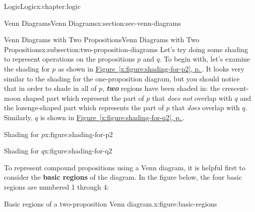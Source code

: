 \documentclass[twoside,10pt,]{book}
\newcommand{\xreffont}{\relax}
\newcommand{\alert}[1]{\textbf{\textit{#1}}}
\newcommand{\terminology}[1]{\textbf{#1}}
\numberwithin{equation}{section}
\begin{document}
\begin{chapterptx}{Logic}{}{Logic}{}{}{x:chapter:logic}
\begin{sectionptx}{Venn Diagrams}{}{Venn Diagrams}{}{}{x:section:sec-venn-diagrams}
\begin{subsectionptx}{Venn Diagrams with Two Propositions}{}{Venn Diagrams with Two Propositions}{}{}{x:subsection:two-proposition-diagrams}
Let's try doing some shading to represent operations on the propositions \(p\) and \(q\).  To begin with, let's examine the shading for \(p\) as shown in \hyperref[x:figure:shading-for-p2]{Figure~{\xreffont\ref{x:figure:shading-for-p2}}, p.\,\pageref{x:figure:shading-for-p2}}.  It looks very similar to the shading for the one-proposition diagram, but you should notice that in order to shade in all of \(p\), \alert{two} regions have been shaded in: the crescent-moon shaped part which represent the part of \(p\) that \emph{does not} overlap with \(q\) and the lozenge-shaped part which represents the part of \(p\) that \emph{does} overlap with \(q\).  Similarly, \(q\) is shown in \hyperref[x:figure:shading-for-q2]{Figure~{\xreffont\ref{x:figure:shading-for-q2}}, p.\,\pageref{x:figure:shading-for-q2}}.%
\par
\begin{sidebyside}{2}{0.05}{0.05}{0.1}%
\begin{sbspanel}{0.4}%
\begin{figureptx}{Shading for \(p\)}{x:figure:shading-for-p2}{}%
\resizebox{\linewidth}{!}{%
\begin{venndiagram2sets}[labelA={$p$},labelB={$q$}]
  \fillA
\end{venndiagram2sets}
}%
\tcblower
\end{figureptx}%
\end{sbspanel}%
\begin{sbspanel}{0.4}%
\begin{figureptx}{Shading for \(q\)}{x:figure:shading-for-q2}{}%
\resizebox{\linewidth}{!}{%
\begin{venndiagram2sets}[labelA={$p$},labelB={$q$}]
  \fillB
\end{venndiagram2sets}
}%
\tcblower
\end{figureptx}%
\end{sbspanel}%
\end{sidebyside}%
%
\par
To represent compound propositions using a Venn diagram, it is helpful first to consider the \terminology{basic regions} of the diagram.  In the figure below, the four basic regions are numbered 1 through 4:%
\par
\begin{figureptx}{Basic regions of a two-proposition Venn diagram.}{x:figure:basic-regions}{}%
\begin{image}{0.3}{0.4}{0.3}%
\resizebox{\linewidth}{!}{%
\begin{venndiagram2sets}[labelA={$p$},labelB={$q$},labelOnlyA={1},labelOnlyB={2},labelAB={3},labelNotAB={4}]

\end{venndiagram2sets}}
\end{image}
\end{figureptx}
\end{subsectionptx}
\end{sectionptx}
\end{chapterptx}
\end{document}
